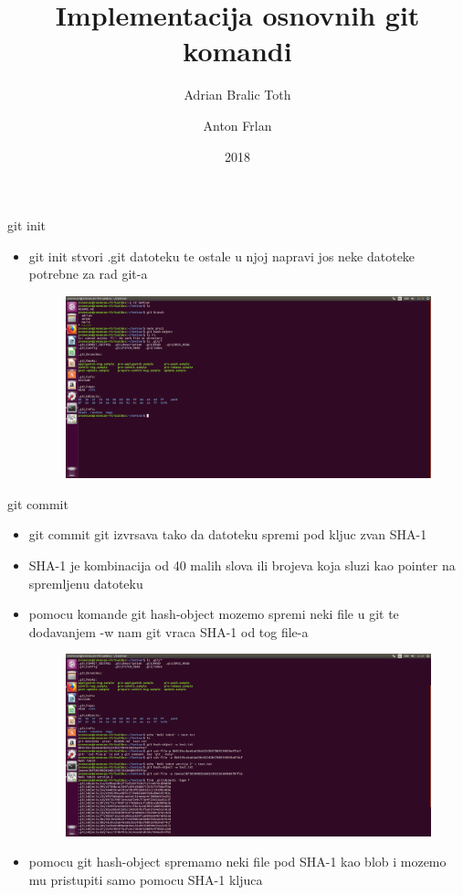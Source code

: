 \documentclass[]{beamer}
\title{Implementacija osnovnih git komandi}
\author{Adrian Bralic Toth \and Anton Frlan}
\institute{Tehnički Fakultet Rijeka}
\date{2018}
\begin{document}
\frame{\titlepage}

\begin{frame}{git init}

\begin{itemize}
	\setlength\itemsep{1em}
	\item git init stvori .git datoteku te ostale u njoj napravi jos neke datoteke potrebne za rad git-a
	\begin{figure}[scale=.48]
\centering
\includegraphics{./slike/git_datoteka.png}
\end{figure}
\end{itemize}

\end{frame}


\begin{frame}{git commit}

\begin{itemize}
	\setlength\itemsep{1.5em}
	\item git commit git izvrsava tako da datoteku spremi pod kljuc zvan SHA-1
	\item SHA-1 je kombinacija od 40 malih slova ili brojeva koja sluzi kao pointer na spremljenu datoteku
	\item pomocu komande git hash-object mozemo spremi neki file u git te dodavanjem -w nam git vraca SHA-1 od tog file-a
	\begin{figure}[scale=.48]
\centering
\includegraphics{./slike/druga_slika.png}
\end{figure}
	\item pomocu git hash-object spremamo neki file pod SHA-1 kao blob i mozemo mu pristupiti samo pomocu SHA-1 kljuca
\end{itemize}

\end{frame}
\end{document}
